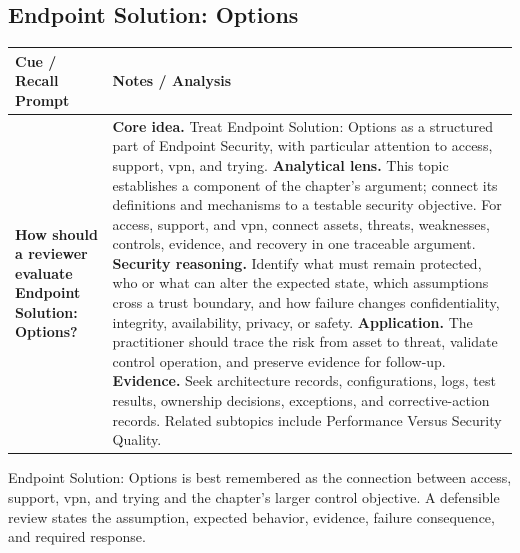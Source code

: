 \documentclass[11pt]{article}
\newcommand{\CornellHeader}{%
\rowcolor{Navy}\color{white}\bfseries Cue / Recall Prompt & \color{white}\bfseries Notes / Analysis\\\hline}
\newcommand{\CornellRow}[2]{%
\cellcolor{CueGray}\RaggedRight\textbf{#1} & \RaggedRight #2\\\hline}
\begin{document}
\subsection*{Endpoint Solution: Options}
\begin{longtable}{>{\RaggedRight\arraybackslash}p{}|>{\RaggedRight\arraybackslash}p{}}
\CornellHeader
\CornellRow{How should a reviewer evaluate Endpoint Solution: Options?}{\textbf{Core idea.} Treat Endpoint Solution: Options as a structured part of Endpoint Security, with particular attention to access, support, vpn, and trying. \textbf{Analytical lens.} This topic establishes a component of the chapter's argument; connect its definitions and mechanisms to a testable security objective. For access, support, and vpn, connect assets, threats, weaknesses, controls, evidence, and recovery in one traceable argument. \textbf{Security reasoning.} Identify what must remain protected, who or what can alter the expected state, which assumptions cross a trust boundary, and how failure changes confidentiality, integrity, availability, privacy, or safety. \textbf{Application.} The practitioner should trace the risk from asset to threat, validate control operation, and preserve evidence for follow-up. \textbf{Evidence.} Seek architecture records, configurations, logs, test results, ownership decisions, exceptions, and corrective-action records. Related subtopics include Performance Versus Security Quality.}
\end{longtable}
\begin{topicsummary}
Endpoint Solution: Options is best remembered as the connection between access, support, vpn, and trying and the chapter's larger control objective. A defensible review states the assumption, expected behavior, evidence, failure consequence, and required response.
\end{topicsummary}
\end{document}
